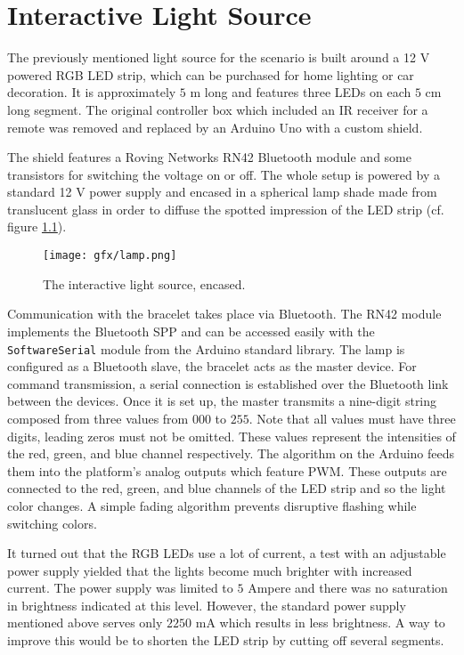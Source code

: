 \chapter{Interactive Light Source}
\label{sec:lamp}

The previously mentioned light source for the scenario is built around a 12 V powered RGB \ac{LED} strip, which can be purchased for home lighting or car decoration. It is approximately $5$ m long and features three \ac{LED}s on each $5$ cm long segment. The original controller box which included an \ac{IR} receiver for a remote was removed and replaced by an Arduino Uno \cite{arduino_uno} with a custom shield. 

The shield features a Roving Networks RN42 Bluetooth module \cite{datasheet_rn42} and some transistors for switching the voltage on or off. The whole setup is powered by a standard 12 V power supply and encased in a spherical lamp shade made from translucent glass in order to diffuse the spotted impression of the LED strip (cf. figure \ref{fig:lamp}).

\begin{figure}[bth]
	\begin{center}
		\texttt{[image: gfx/lamp.png]}
	\end{center}
	\caption{The interactive light source, encased.} \label{fig:lamp}
\end{figure} 

Communication with the bracelet takes place via Bluetooth. The RN42 module implements the Bluetooth \ac{SPP} and can be accessed easily with the \texttt{SoftwareSerial} module from the Arduino standard library. The lamp is configured as a Bluetooth slave, the bracelet acts as the master device. For command transmission, a serial connection is established over the Bluetooth link between the devices. Once it is set up, the master transmits a nine-digit string composed from three values from $000$ to $255$. Note that all values must have three digits, leading zeros must not be omitted. These values represent the intensities of the red, green, and blue channel respectively. The algorithm on the Arduino feeds them into the platform's analog outputs which feature \ac{PWM}. These outputs are connected to the red, green, and blue channels of the \ac{LED} strip and so the light color changes. A simple fading algorithm prevents disruptive flashing while switching colors.

It turned out that the RGB \ac{LED}s use a lot of current, a test with an adjustable power supply yielded that the lights become much brighter with increased current. The power supply was limited to $5$ Ampere and there was no saturation in brightness indicated at this level. However, the standard power supply mentioned above serves only $2250$ mA which results in less brightness. A way to improve this would be to shorten the \ac{LED} strip by cutting off several segments.